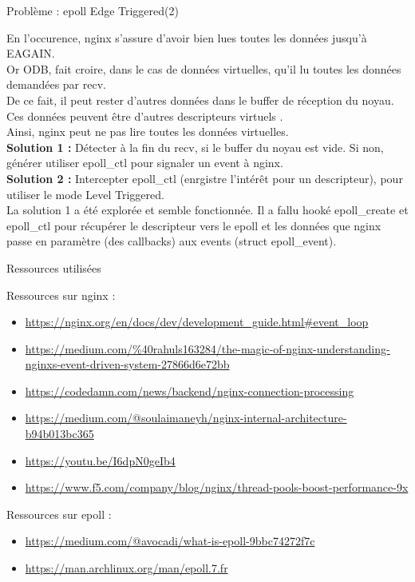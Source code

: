 \documentclass[aspectratio=43,8pt]{beamer}
\begin{document}
\begin{frame}{Problème : epoll Edge Triggered(2)}
\begin{card}
	En l'occurence, nginx s'assure d'avoir bien lues toutes les données jusqu'à EAGAIN.\\
	Or ODB, fait croire, dans le cas de données virtuelles, qu'il lu toutes les données demandées par recv.\\
	De ce fait, il peut rester d'autres données dans le buffer de réception du noyau.\\
	Ces données peuvent être d'autres descripteurs virtuels .\\
	Ainsi, nginx peut ne pas lire toutes les données virtuelles.\\

	\textbf{Solution 1 :} Détecter à la fin du recv, si le buffer du noyau est vide. Si non, générer utiliser  epoll\_ctl pour signaler un event à nginx.\\
	\textbf{Solution 2 :} Intercepter epoll\_ctl (enrgistre l'intérêt pour un descripteur), pour utiliser le mode Level Triggered.\\

    La solution 1 a été explorée et semble fonctionnée. Il a fallu hooké epoll\_create et epoll\_ctl pour récupérer le descripteur vers le epoll et les données que nginx passe en paramètre (des callbacks) aux events (struct epoll\_event).
\end{card}
\end{frame}

\begin{frame}{Ressources utilisées}
\begin{card}
    Ressources sur nginx :
    	\begin{itemize}
    		\item \url{https://nginx.org/en/docs/dev/development_guide.html#event_loop}
    		\item \url{https://medium.com/%40rahuls163284/the-magic-of-nginx-understanding-nginxs-event-driven-system-27866d6e72bb}
    		\item \url{https://codedamn.com/news/backend/nginx-connection-processing}
    		\item \url{https://medium.com/@soulaimaneyh/nginx-internal-architecture-b94b013bc365}
    		\item \url{https://youtu.be/I6dpN0geIb4}
    		\item \url{https://www.f5.com/company/blog/nginx/thread-pools-boost-performance-9x}
    	\end{itemize}
    Ressources sur epoll :
        \begin{itemize} 
        	\item \url{https://medium.com/@avocadi/what-is-epoll-9bbc74272f7c}
        	\item \url{https://man.archlinux.org/man/epoll.7.fr}
        \end{itemize}
\end{card}
\end{frame}
\end{document}
